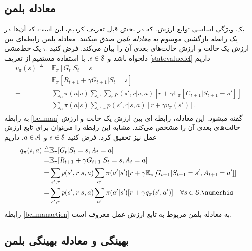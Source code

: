 \subsection{معادله بلمن}
یک ویژگی اساسی توابع ارزش، که در بخش قبل تعریف کردیم، این است که آن‌ها در یک رابطه بازگشتی موسوم به 
\textit{معادله بلمن} 
صدق می\nf کنند. معادله بلمن رابطه‌ای بین ارزش یک حالت و ارزش‌ حالت‌های بعدی آن را بیان می‌کند.
فرض کنید $\pi$ یک خط‌مشی دلخواه باشد و
 $s \in \EuScript{S}$.
  با استفاده مستقیم از تعریف
 \ref{statevaluedef}
 داریم
 \cite{suttonbook}
\begin{align}
v_\pi (s) \triangleq& \mathbb{E}_\pi [G_t | S_t = s] \nonumber \\
=& \mathbb{E}_\pi [R_{t+1}+ \gamma G_{t+1}|S_t=s] \nonumber \\
=&\sum_{a} \pi(a|s) \sum_{s'}\sum_{r} p(s',r|s,a)[r+\gamma \mathbb{E}_\pi[G_{t+1}|S_{t+1}=s']] \nonumber\\
=&\sum_{a} \pi(a|s) \sum_{s',r} p(s',r|s,a)[r+\gamma v_\pi(s')] %
\label{bellman}.
\end{align}
به رابطه 
 \ref{bellman}
 گفته می\nf شود. این معادله، رابطه ای بین ارزش یک حالت و ارزش حالت‌های بعدی آن را مشخص می‌کند. مشابه این رابطه را می‌توان برای تابع ارزش عمل نیز تحقیق کرد. فرض کنید 
$s \in \EuScript{S}$
 و 
 $a \in \EuScript{A}$.
 داریم
\begin{align}
q_\pi (s,a) \triangleq& \mathbb{E}_\pi [G_t | S_t = s, A_t = a] \nonumber \\
=& \mathbb{E}_\pi [R_{t+1}+ \gamma G_{t+1}|S_t=s, A_t = a] \nonumber \\
=&\sum_{s',r} p(s',r|s,a) \sum_{a'} \pi(a'|s')[r+\gamma \mathbb{E}_\pi[G_{t+1}|S_{t+1}=s', A_{t+1} = a']] \nonumber\\
=&\sum_{s',r}  p(s',r|s,a) \sum_{a'} \pi(a'|s')[r+\gamma q_\pi(s',a')] \quad \forall s \in \EuScript{S}. \numerhis 
\label{bellmanaction}
\end{align}
رابطه \ref{bellmanaction} به معادله بلمن مربوط به تابع ارزش عمل معروف است.
\subsection{بهینگی و معادله بهینگی بلمن}

